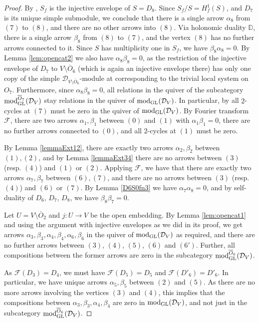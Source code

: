 \documentclass[11pt,reqno]{amsart}
\renewcommand{\a}{\alpha}
\renewcommand{\b}{\beta}
\newcommand{\D}{\mathcal{D}}
\newcommand{\tn}{\textnormal}
\newcommand{\GL}{\operatorname{GL}}
\newcommand{\bb}[1]{\mathbb{#1}}
\newcommand{\mc}[1]{\mathcal{#1}}
\newcommand{\ol}[1]{\overline{#1}}
\numberwithin{equation}{section}
\begin{document}
\begin{proof}
By \cite[Lemma 2.4]{binary}, $S_f$ is the injective envelope of $S=D_8$. Since $S_f/S=H_f^1(S)$, and $D_7$ is its unique simple submodule, we conclude that there is a single arrow $\a_8$ from $(7)$ to $(8)$, and there are no other arrows into $(8)$. Via holonomic duality $\bb{D}$, there is a single arrow $\b_8$ from $(8)$ to $(7)$, and the vertex $(8)$ has no further arrows connected to it. Since $S$ has multiplicity one in $S_f$, we have $\b_8 \a_8=0$.  By Lemma \ref{lem:opencat2} we also have $\a_8 \b_8 =0$, as the restriction of the injective envelope of $D_7$ to $V\setminus \ol{O}_6$ (which is again an injective envelope there) has only one copy of the simple $\D_{V\setminus \ol{O}_6}$-module at corresponding to the trivial local system on $O_7$. Furthermore, since $\a_8\b_8 =0$, all relations in the quiver of the subcategory  $\tn{mod}_{\GL}^{\ol{O}_7}(\D_V)$ stay relations in the quiver of $\tn{mod}_{\GL}(\D_V)$. In particular, by \cite[Corollary 3.9]{lHorincz2019categories} all $2$-cycles at $(7)$ must be zero in the quiver of  $\tn{mod}_{\GL}(\D_V)$. By Fourier transform $\mc{F}$, there are two arrows $\a_1,\b_1$ between $(0)$ and $(1)$ with $\a_1 \b_1=0$, there are no further arrows connected to $(0)$, and all $2$-cycles at $(1)$ must be zero. 

By Lemma \ref{lemmaExt12}, there are exactly two arrows $\a_2, \b_2$ between $(1), (2)$, and by Lemma \ref{lemmaExt34} there are no arrows between $(3)$ (resp. $(4)$) and $(1)$ or $(2)$. Applying $\mc{F}$, we have that there are exactly two arrows $\a_7,\b_7$ between $(6),(7)$, and there are no arrows between $(3)$ (resp. $(4)$) and $(6)$ or $(7)$. By Lemma \ref{D6S0fn3} we have $\a_7 \a_8=0$, and by self-duality of $D_6$, $D_7$, $D_8$, we have $\b_8 \b_7=0$.

Let $U= V\setminus \ol{O}_2$ and $j: U \to V$ be the open embedding. By Lemma \ref{lem:opencat1} and using the argument with injective envelopes as we did in its proof, we get arrows $\a_3, \b_3, \a_4, \b_4, \a_6,\b_6$ in the quiver of $\tn{mod}_{\GL}(\D_V)$ as required, and there are no further arrows between $(3)$, $(4)$, $(5)$, $(6)$ and $(6')$. Further, all compositions between the former arrows are zero in the subcategory $\tn{mod}_{\GL}^{\ol{O}_6}(\D_V)$. 

As $\mc{F}(D_3) = D_4$, we must have $\mc{F}(D_5) = D_5$ and $\mc{F}(D'_{6}) = D'_6$. In particular, we have unique arrows $\a_5, \b_5$ between $(2)$ and $(5)$. As there are no more arrows involving the vertices $(3)$ and $(4)$, this implies that the compositions between $\a_3, \b_3, \a_4, \b_4$ are zero in $\tn{mod}_{\GL}(\D_V)$, and not just in the subcategory $\tn{mod}_{\GL}^{\ol{O}_6}(\D_V)$.



\end{proof}
\end{document}
